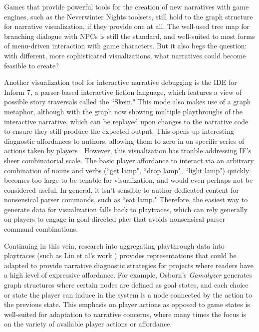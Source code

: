 Games that provide powerful tools for the creation of new narratives with game engines, such as the Neverwinter Nights toolsets, still hold to the graph structure for narrative visualization, if they provide one at all. The well-used tree map for branching dialogue with NPCs is still the standard, and well-suited to most forms of menu-driven interaction with game characters. But it also begs the question: with different, more sophisticated visualizations, what narratives could become feasible to create?

Another visualization tool for interactive narrative debugging is the IDE for Inform 7, a parser-based interactive fiction language, which features a view of possible story traversals called the ``Skein." This mode also makes use of a graph metaphor, although with the graph now showing multiple playthroughs of the interactive narrative, which can be replayed upon changes to the narrative code to ensure they still produce the expected output. This opens up interesting diagnostic affordances to authors, allowing them to zero in on specific series of actions taken by players \cite{reed_inform}. However, this visualization has trouble addressing IF’s sheer combinatorial scale. The basic player affordance to interact via an arbitrary combination of nouns and verbs (``get lamp", ``drop lamp", ``light lamp") quickly becomes too large to be tenable for visualization, and would even perhaps not be considered useful. In general, it isn’t sensible to author dedicated content for nonsensical parser commands, such as ``eat lamp." Therefore, the easiest way to generate data for visualization falls back to playtraces, which can rely generally on players to engage in goal-directed play that avoids nonsensical parser command combinations.

Continuing in this vein, research into aggregating playthrough data into playtraces (such as Liu et al's work \cite{playtraces}) provides representations that could be adapted to provide narrative diagnostic strategies for projects where readers have a high level of expressive affordance. For example, Osborn's \textit{Gamalyzer} \cite{Osborn_playtracer} generates graph structures where certain nodes are defined as goal states, and each choice or state the player can induce in the system is a node connected by the action to the previous state. This emphasis on player actions as opposed to game states is well-suited for adaptation to narrative concerns, where many times the focus is on the variety of available player actions or affordance.

